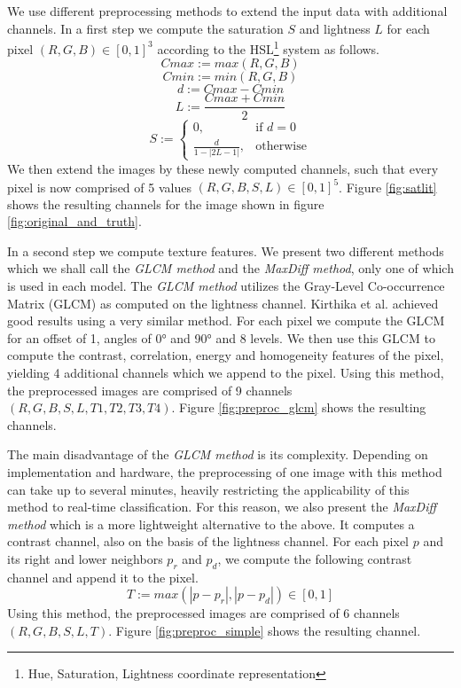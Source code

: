 \documentclass[10pt,conference,compsocconf]{IEEEtran}
\begin{document}
We use different preprocessing methods to extend the input data with additional channels.
In a first step we compute the saturation $S$ and lightness $L$ for each pixel $(R,G,B) \in [0,1]^3$ according to the HSL\footnote{Hue, Saturation, Lightness coordinate representation} system as follows.
$$ Cmax := max(R,G,B) $$
$$ Cmin := min(R,G,B) $$
$$d := Cmax - Cmin$$
$$ L := \frac{Cmax + Cmin}{2} $$
\[
S :=
\begin{cases}
	0, & \text{if } d = 0\\
	\frac{d}{1-|2L-1|}, & \text{otherwise}
\end{cases}
\]
We then extend the images by these newly computed channels, such that every pixel is now comprised of 5 values $(R,G,B,S,L) \in [0,1]^5$. Figure \ref{fig:satlit} shows the resulting channels for the image shown in figure \ref{fig:original_and_truth}.

In a second step we compute texture features.
We present two different methods which we shall call the \emph{GLCM method} and the \emph{MaxDiff method}, only one of which is used in each model.
The \emph{GLCM method} utilizes the Gray-Level Co-occurrence Matrix (GLCM) \cite{glcm} as computed on the lightness channel.
Kirthika et al. \cite{kirthika2011automated} achieved good results using a very similar method.
For each pixel we compute the GLCM for an offset of 1, angles of 0° and 90° and 8 levels.
We then use this GLCM to compute the contrast, correlation, energy and homogeneity features of the pixel, yielding 4 additional channels which we append to the pixel.
Using this method, the preprocessed images are comprised of 9 channels $(R,G,B,S,L,T1,T2,T3,T4)$.
Figure \ref{fig:preproc_glcm} shows the resulting channels.

The main disadvantage of the \emph{GLCM method} is its complexity.
Depending on implementation and hardware, the preprocessing of one image with this method can take up to several minutes, heavily restricting the applicability of this method to real-time classification.
For this reason, we also present the \emph{MaxDiff method} which is a more lightweight alternative to the above.
It computes a contrast channel, also on the basis of the lightness channel.
For each pixel $p$ and its right and lower neighbors $p_r$ and $p_d$, we compute the following contrast channel and append it to the pixel.
$$ T := max(|p-p_r|,|p-p_d|) \in [0,1] $$
Using this method, the preprocessed images are comprised of 6 channels $(R,G,B,S,L,T)$.
Figure \ref{fig:preproc_simple} shows the resulting channel.
\end{document}
